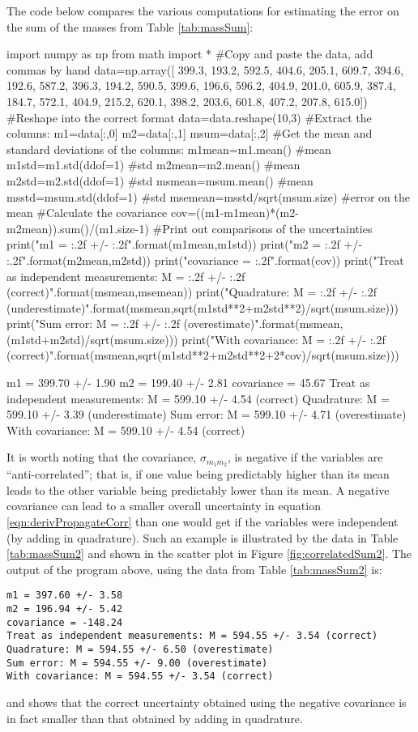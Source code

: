 The code below compares the various computations for estimating the error on the sum of the masses from Table \ref{tab:massSum}:
\begin{python}[caption = Different error calculations for a set of values]
import numpy as np
from math import *
#Copy and paste the data, add commas by hand
data=np.array([
399.3, 193.2, 592.5,
404.6, 205.1, 609.7,
394.6, 192.6, 587.2,
396.3, 194.2, 590.5,
399.6, 196.6, 596.2,
404.9, 201.0, 605.9,
387.4, 184.7, 572.1,
404.9, 215.2, 620.1,
398.2, 203.6, 601.8,
407.2, 207.8, 615.0])
#Reshape into the correct format
data=data.reshape(10,3)
#Extract the columns:
m1=data[:,0]
m2=data[:,1]
msum=data[:,2]
#Get the mean and standard deviations of the columns:
m1mean=m1.mean() #mean
m1std=m1.std(ddof=1) #std
m2mean=m2.mean() #mean
m2std=m2.std(ddof=1) #std
msmean=msum.mean() #mean
msstd=msum.std(ddof=1) #std
msemean=msstd/sqrt(msum.size) #error on the mean
#Calculate the covariance
cov=((m1-m1mean)*(m2-m2mean)).sum()/(m1.size-1)
#Print out comparisons of the uncertainties
print("m1 = {:.2f} +/- {:.2f}".format(m1mean,m1std))
print("m2 = {:.2f} +/- {:.2f}".format(m2mean,m2std))
print("covariance = {:.2f}".format(cov))
print("Treat as independent measurements: M = {:.2f} +/- {:.2f} (correct)".format(msmean,msemean))
print("Quadrature: M = {:.2f} +/- {:.2f} (underestimate)".format(msmean,sqrt(m1std**2+m2std**2)/sqrt(msum.size)))
print("Sum error: M = {:.2f} +/- {:.2f} (overestimate)".format(msmean,(m1std+m2std)/sqrt(msum.size)))
print("With covariance: M = {:.2f} +/- {:.2f} (correct)".format(msmean,sqrt(m1std**2+m2std**2+2*cov)/sqrt(msum.size)))
\end{python}
\begin{poutput}
m1 = 399.70 +/- 1.90
m2 = 199.40 +/- 2.81
covariance = 45.67
Treat as independent measurements: M = 599.10 +/- 4.54 (correct)
Quadrature: M = 599.10 +/- 3.39 (underestimate)
Sum error: M = 599.10 +/- 4.71 (overestimate)
With covariance: M = 599.10 +/- 4.54 (correct)
\end{poutput}

It is worth noting that the covariance, $\sigma_{m_1m_2}$, is negative if the variables are ``anti-correlated''; that is, if one value being predictably higher than its mean leads to the other variable being predictably lower than its mean. A negative covariance can lead to a smaller overall uncertainty in equation \ref{eqn:derivPropagateCorr} than one would get if the variables were independent (by adding in quadrature). Such an example is illustrated by the data in Table \ref{tab:massSum2} and shown in the scatter plot in Figure \ref{fig:correlatedSum2}. The output of the program above, using the data from Table \ref{tab:massSum2} is:
\begin{verbatim}
m1 = 397.60 +/- 3.58
m2 = 196.94 +/- 5.42
covariance = -148.24
Treat as independent measurements: M = 594.55 +/- 3.54 (correct)
Quadrature: M = 594.55 +/- 6.50 (overestimate)
Sum error: M = 594.55 +/- 9.00 (overestimate)
With covariance: M = 594.55 +/- 3.54 (correct)
\end{verbatim}
and shows that the correct uncertainty obtained using the negative covariance is in fact smaller than that obtained by adding in quadrature.


